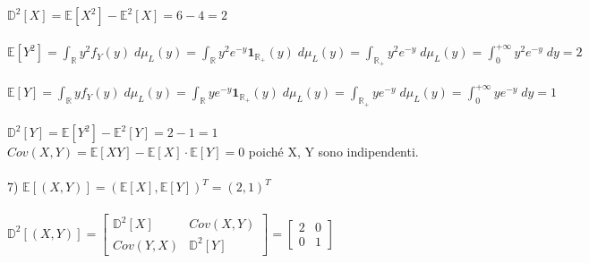 \documentclass{article}
\begin{document}
$\mathbb{D}^{2}[X] = \mathbb{E}[X^{2}] - \mathbb{E}^{2}[X] = 6-4 = 2$\\ \\
$\mathbb{E}[Y^{2}] = \int_{\mathbb{R}}^{}y^{2}f_{Y}(y) \; d\mu_{L}(y) = \int_{\mathbb{R}}^{}y^{2}e^{-y} \mathbf{1}_{\mathbb{R}_{+}}(y) \; d\mu_{L}(y) = \int_{\mathbb{R}_{+}}^{}y^{2}e^{-y} \; d\mu_{L}(y) = \int_{0}^{+\infty}y^{2}e^{-y} \; dy = 2$\\ \\
$\mathbb{E}[Y] = \int_{\mathbb{R}}^{}yf_{Y}(y) \; d\mu_{L}(y) = \int_{\mathbb{R}}^{}ye^{-y} \mathbf{1}_{\mathbb{R}_{+}}(y) \; d\mu_{L}(y) = \int_{\mathbb{R}_{+}}^{}ye^{-y} \; d\mu_{L}(y) = \int_{0}^{+\infty}ye^{-y} \; dy = 1$\\ \\
$\mathbb{D}^{2}[Y] = \mathbb{E}[Y^{2}] - \mathbb{E}^{2}[Y] = 2-1 = 1$\\
$Cov(X,Y) = \mathbb{E}[XY] - \mathbb{E}[X]\cdot \mathbb{E}[Y] = 0$ poiché X, Y sono indipendenti.\\
\\
7) $\mathbb{E}[(X,Y)] = (\mathbb{E}[X], \mathbb{E}[Y])^{T} = (2,1)^{T}$\\ \\
$\mathbb{D}^{2}[(X,Y)] = \left[\begin{matrix} \mathbb{D}^{2}[X] & Cov(X,Y) \\ Cov(Y,X) & \mathbb{D}^{2}[Y] \end{matrix}\right] = \left[\begin{matrix} 2 & 0 \\ 0 & 1 \end{matrix}\right]$
\end{document}
